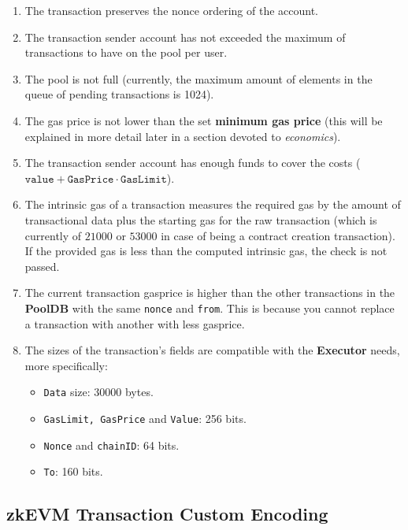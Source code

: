 \begin{enumerate}
\item The transaction preserves the nonce ordering of the account.

\item The transaction sender account has not exceeded the maximum of transactions to have on the pool per user.

\item The pool is not full (currently, the maximum amount of elements in the queue of pending transactions is 1024).

\item The gas price is not lower than the set \textbf{minimum gas price} (this will be explained in more detail later in a section devoted to \textit{economics}).

\item The transaction sender account has enough funds to cover the costs ($\texttt{value} + \texttt{GasPrice} \cdot \texttt{GasLimit}$).

\item The intrinsic gas of a transaction measures the required gas by the amount of transactional data plus the starting gas for the raw transaction (which is currently of $21000$ or $53000$ in case of being a contract creation transaction). If the provided gas is less than the computed intrinsic gas, the check is not passed.

\item The current transaction gasprice is higher than the other transactions in the \textbf{PoolDB} with the same \texttt{nonce} and \texttt{from}. This is because you cannot replace a transaction with another with less gasprice.

\item The sizes of the transaction's fields are compatible with the \textbf{Executor} needs, more specifically:

\begin{itemize}
	\item \texttt{Data} size: 30000 bytes.
	\item \texttt{GasLimit, GasPrice} and \texttt{Value}: 256 bits.
	\item \texttt{Nonce} and \texttt{chainID}: 64 bits.
	\item \texttt{To}: 160 bits.
\end{itemize}

\end{enumerate}


\subsection{zkEVM Transaction Custom Encoding} \label{sec:encoding}

